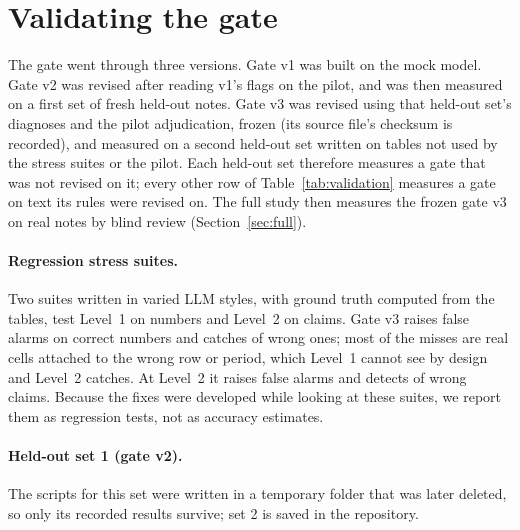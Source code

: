 \documentclass[11pt]{article}
\begin{document}
\section{Validating the gate}
\label{sec:validation}

The gate went through three versions. Gate v1 was built on the mock model. Gate v2 was revised after reading v1's flags on the pilot, and was then measured on a first set of fresh held-out notes. Gate v3 was revised using that held-out set's diagnoses and the pilot adjudication, frozen (its source file's checksum is recorded), and measured on a second held-out set written on tables not used by the stress suites or the pilot. Each held-out set therefore measures a gate that was not revised on it; every other row of Table~\ref{tab:validation} measures a gate on text its rules were revised on. The full study then measures the frozen gate v3 on \FullNotes{} real notes by blind review (Section~\ref{sec:full}).

\begin{table}[t]
\centering
\caption{Accuracy of the gate on its test sets. False alarms are correct numbers (L1) or claims (L2) flagged as errors; caught errors are deliberately wrong (or, for the pilot, adjudicated wrong) numbers and claims that were flagged. Only the held-out rows measure a gate on text its rules were not revised on.}
\label{tab:validation}

\end{table}

\paragraph{Regression stress suites.} Two suites written in varied LLM styles, with ground truth computed from the tables, test Level~1 on \SuiteLoneItems{} numbers and Level~2 on \SuiteLtwoItems{} claims. Gate v3 raises \SuiteLoneFA{} false alarms on \SuiteLoneCorrect{} correct numbers and catches \SuiteLoneCaught{} of \SuiteLoneWrong{} wrong ones; most of the misses are real cells attached to the wrong row or period, which Level~1 cannot see by design and Level~2 catches. At Level~2 it raises \SuiteLtwoFA{} false alarms and detects \SuiteLtwoCaught{} of \SuiteLtwoWrong{} wrong claims. Because the fixes were developed while looking at these suites, we report them as regression tests, not as accuracy estimates.

\paragraph{Held-out set 1 (gate v2).} \HeldLone{} \HeldLtwo{} The scripts for this set were written in a temporary folder that was later deleted, so only its recorded results survive; set 2 is saved in the repository.
\end{document}
